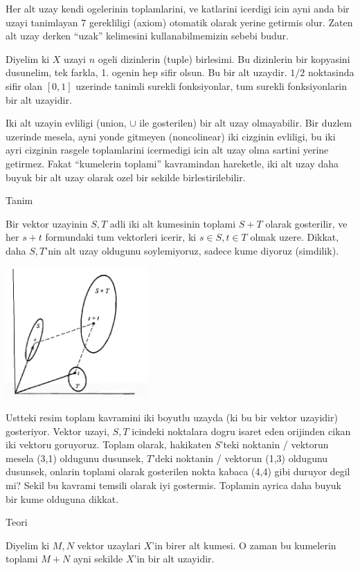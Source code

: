 \documentclass[12pt,fleqn]{article}\usepackage{../common}
\begin{document}
Her alt uzay kendi ogelerinin toplamlarini, ve katlarini icerdigi icin ayni
anda bir uzayi tanimlayan 7 gerekliligi (axiom) otomatik olarak yerine
getirmis olur. Zaten alt uzay derken ``uzak'' kelimesini kullanabilmemizin
sebebi budur. 

Diyelim ki $X$ uzayi $n$ ogeli dizinlerin (tuple) birlesimi. Bu dizinlerin
bir kopyasini dusunelim, tek farkla, 1. ogenin hep sifir olsun. Bu bir alt
uzaydir. $1/2$ noktasinda sifir olan $[0,1]$ uzerinde tanimli surekli
fonksiyonlar, tum surekli fonksiyonlarin bir alt uzayidir. 

Iki alt uzayin evliligi (union, $\cup$ ile gosterilen) bir alt uzay
olmayabilir. Bir duzlem uzerinde mesela, ayni yonde gitmeyen (noncolinear)
iki cizginin evliligi, bu iki ayri cizginin rasgele toplamlarini icermedigi
icin alt uzay olma sartini yerine getirmez. Fakat ``kumelerin toplami''
kavramindan hareketle, iki alt uzay daha buyuk bir alt uzay olarak ozel bir
sekilde birlestirilebilir.

Tanim

Bir vektor uzayinin $S,T$ adli iki alt kumesinin toplami $S+T$ olarak
gosterilir, ve her $s+t$ formundaki tum vektorleri icerir, ki $s \in S,t
\in T$ 
olmak uzere. Dikkat, daha $S,T$'nin alt uzay oldugunu soylemiyoruz, sadece
kume diyoruz (simdilik). 

\includegraphics[height=5cm]{3_1.png}

Ustteki resim toplam kavramini iki boyutlu uzayda (ki bu bir vektor
uzayidir) gosteriyor. Vektor uzayi, $S,T$ icindeki noktalara dogru isaret
eden orijinden cikan iki vektoru goruyoruz. Toplam olarak, hakikaten
$S$'teki noktanin / vektorun mesela (3,1) oldugunu dusunsek, $T$'deki
noktanin / vektorun (1,3) oldugunu dusunsek, onlarin toplami olarak
gosterilen nokta kabaca (4,4) gibi duruyor degil mi? Sekil bu kavrami
temsili olarak iyi gostermis. Toplamin ayrica daha buyuk bir kume olduguna
dikkat. 

Teori 

Diyelim ki $M,N$ vektor uzaylari $X$'in birer alt kumesi. O zaman bu kumelerin
toplami $M + N$ ayni sekilde $X$'in bir alt uzayidir. 
\end{document}
